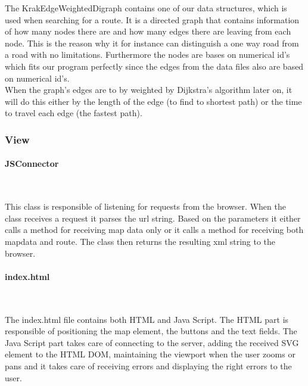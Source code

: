 \documentclass[a4paper,10pt,titlepage]{article}
\begin{document}
The KrakEdgeWeightedDigraph\cite{sedgewickAndWayneEdgeWeightedDigraph} contains one of our data structures, which is used when searching for a route. It is a directed graph that contains information of how many nodes there are and how many edges there are leaving from each node. This is the reason why it for instance can distinguish a one way road from a road with no limitations. Furthermore the nodes are bases on numerical id’s which fits our program perfectly since the edges from the data files also are based on numerical id’s. \\
When the graph’s edges are to by weighted by Dijkstra’s algorithm later on, it will do this either by the length of the edge (to find to shortest path) or the time to travel each edge (the fastest path).\\



				
			\subsubsection{View}
			
				\paragraph{JSConnector}\mbox{}\
				
				This class is responsible of listening for requests from the browser. When the class receives a request it parses the url string. Based on the parameters it either calls a method for receiving map data only or it calls a method for receiving both mapdata and route. The class then returns the resulting xml string to the browser. 
						
				\paragraph{index.html}\mbox{}\
				
				The index.html file contains both HTML and Java Script. The HTML part is responsible of positioning the map element, the buttons and the text fields. The Java Script part takes care of connecting to the server, adding the received SVG element to the HTML DOM, maintaining the viewport when the user zooms or pans and it takes care of receiving errors and displaying the right errors to the user. 
		\newpage	
\end{document}
